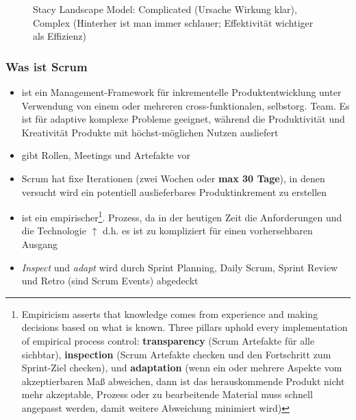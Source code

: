 \begin{figure}[h]
  \centering
  \scalebox{0.9}{{}}
  \caption{Stacy Landscape Model: Complicated (Ursache Wirkung klar), Complex (Hinterher ist man
    immer schlauer; Effektivität wichtiger als Effizienz)}
  \label{fig:1}
\end{figure}


\subsubsection{Was ist Scrum}
\begin{itemize}
  \item ist ein Management-Framework für inkrementelle Produktentwicklung unter Verwendung von einem
    oder mehreren cross-funktionalen, selbstorg. Team.
    Es ist für adaptive komplexe Probleme geeignet, während die Produktivität und
    Kreativität Produkte mit höchst-möglichen Nutzen ausliefert
  \item gibt Rollen, Meetings und Artefakte vor
  \item Scrum hat fixe Iterationen (zwei Wochen oder \textbf{max 30 Tage}), in denen versucht wird ein
    potentiell auslieferbares Produktinkrement zu erstellen
  \item ist ein empirischer\footnote{Empiricism asserts that knowledge comes from experience and
    making decisions based on what is known. Three pillars uphold every implementation of
    empirical process control: \textbf{transparency} (Scrum Artefakte für alle sichbtar),
    \textbf{inspection} (Scrum Artefakte checken und den Fortschritt zum
    Sprint-Ziel checken), und \textbf{adaptation} (wenn ein oder
    mehrere Aspekte vom akzeptierbaren Maß abweichen, dann ist das herauskommende Produkt
    nicht mehr akzeptable, Prozess oder zu bearbeitende Material muss schnell angepasst werden, damit weitere
    Abweichung minimiert wird)}. Prozess, da in der heutigen Zeit die Anforderungen und die Technologie
    $\uparrow$ d.h. es ist zu kompliziert für einen vorhersehbaren Ausgang
  \item \textit{Inspect} und \textit{adapt} wird durch Sprint Planning, Daily Scrum, Sprint Review und Retro
    (sind Scrum Events) abgedeckt
\end{itemize}


